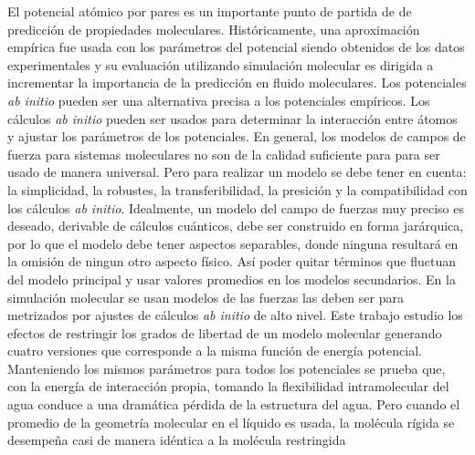 El potencial at\'omico por pares es un importante punto de partida de
de predicci\'on de propiedades moleculares. Hist\'oricamente, una
aproximaci\'on emp\'irica fue usada con los par\'ametros del
potencial siendo obtenidos de los datos experimentales y su 
evaluaci\'on utilizando simulaci\'on molecular es dirigida a 
incrementar la importancia de la predicci\'on en fluido moleculares. 
Los potenciales {\it ab initio} pueden ser una alternativa precisa a 
los potenciales emp\'iricos. Los c\'alculos {\it ab initio} pueden 
ser usados para determinar la interacci\'on entre \'atomos y ajustar 
los par\'ametros de los potenciales.
En general, los modelos de campos de fuerza para sistemas moleculares
no son de la calidad suficiente para para ser usado de manera 
universal. Pero para realizar un modelo se debe tener en cuenta: la
simplicidad, la robustes, la transferibilidad, la presici\'on y la
compatibilidad con los c\'alculos {\it ab initio}. Idealmente, un 
modelo del campo de fuerzas muy preciso es deseado, derivable de 
c\'alculos cu\'anticos, debe ser construido en forma jar\'arquica, 
por lo que el modelo debe tener aspectos separables, donde ninguna
resultar\'a en la omisi\'on de ningun otro aspecto f\'isico. As\'i
poder quitar t\'erminos que fluctuan del modelo principal y usar
valores promedios en los modelos secundarios.
En la simulaci\'on molecular se usan modelos de las fuerzas las deben
ser para metrizados por ajustes de c\'alculos {\it ab initio} de alto
nivel.
Este trabajo estudio los efectos de restringir los grados de libertad
de un modelo molecular generando cuatro versiones que corresponde a 
la misma funci\'on de energ\'ia potencial. Manteniendo los mismos 
par\'ametros para todos los potenciales se prueba que, con la 
energ\'ia de interacci\'on propia, tomando la flexibilidad 
intramolecular del agua conduce a una dram\'atica p\'erdida de la
estructura del agua. Pero cuando el promedio de la geometr\'ia
molecular en el l\'iquido es usada, la mol\'ecula r\'igida se 
desempe\~na casi de manera id\'entica a la mol\'ecula restringida 
